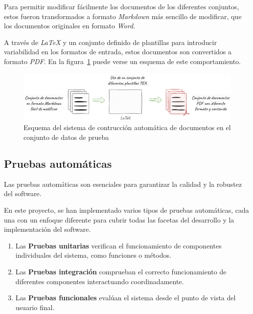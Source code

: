 Para permitir modificar fácilmente los documentos de los diferentes conjuntos, estos fueron transformados a formato
\textit{Markdown} más sencillo de modificar, que los documentos originales en formato \textit{Word}.

A través de \textit{LaTeX} y un conjunto definido de plantillas para introducir variabilidad en los formatos de
entrada, estos documentos son convertidos a formato \textit{PDF}.
En la figura~\ref{fig:chapter_4.5.dataset_construction_overview} puede verse un esquema de este comportamiento.

\begin{figure}[ht]
    \begin{center}
        \includegraphics[width=\textwidth]{./chapter/4/images/chapter_4.5.dataset_construction_overview}
        \caption{Esquema del sistema de contrucción automática de documentos en el conjunto de datos de prueba}
        \label{fig:chapter_4.5.dataset_construction_overview}
    \end{center}
\end{figure}

\subsection*{Pruebas automáticas}

Las pruebas automáticas son esenciales para garantizar la calidad y la robustez del software.

En este proyecto, se han implementado varios tipos de pruebas automáticas, cada una con un enfoque diferente para cubrir
todas las facetas del desarrollo y la implementación del software.

\begin{enumerate}
    \item Las \textbf{Pruebas unitarias} verifican el funcionamiento de componentes individuales del sistema, como
    funciones o métodos.
    \item Las \textbf{Pruebas integración} comprueban el correcto funcionamiento de diferentes componentes
    interactuando coordinadamente.
    \item Las \textbf{Pruebas funcionales} evalúan el sistema desde el punto de vista del usuario final.
\end{enumerate}

